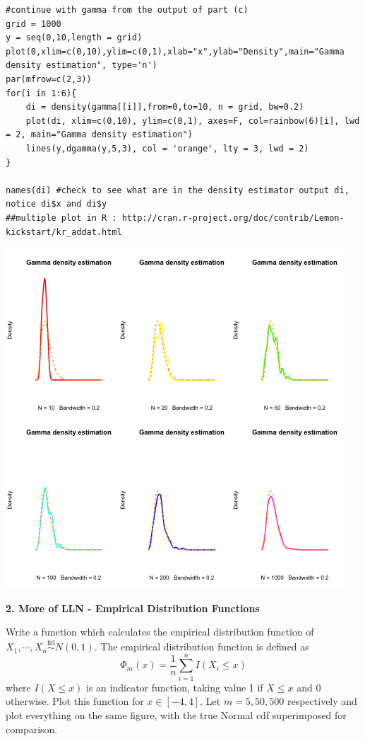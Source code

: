\documentclass[letter,10.5pt]{article}
\numberwithin{equation}{subsection}
\begin{document}
\begin{boxedminipage}{\textwidth}
\scriptsize
\begin{verbatim}
#continue with gamma from the output of part (c)
grid = 1000
y = seq(0,10,length = grid)
plot(0,xlim=c(0,10),ylim=c(0,1),xlab="x",ylab="Density",main="Gamma density estimation", type='n')
par(mfrow=c(2,3))
for(i in 1:6){
    di = density(gamma[[i]],from=0,to=10, n = grid, bw=0.2)
    plot(di, xlim=c(0,10), ylim=c(0,1), axes=F, col=rainbow(6)[i], lwd = 2, main="Gamma density estimation")
    lines(y,dgamma(y,5,3), col = 'orange', lty = 3, lwd = 2)
}

names(di) #check to see what are in the density estimator output di, notice di$x and di$y
##multiple plot in R : http://cran.r-project.org/doc/contrib/Lemon-kickstart/kr_addat.html
\end{verbatim}
\end{boxedminipage}
\begin{center}
\includegraphics[scale=0.4]{1d23.png}
\end{center}

\noindent
\large
\textbf{2. More of LLN - Empirical Distribution Functions}
\normalsize

Write a function which calculates the empirical distribution function of $X_1,\cdots,X_n\stackrel{\text{iid}}{\sim}N(0,1)$. The empirical distribution function is defined as
\begin{equation*}
\Phi_m(x) = \frac{1}{n}\sum_{i=1}^nI(X_i\leq x)
\end{equation*}
where $I(X\leq x)$ is an indicator function, taking value 1 if $X\leq x$ and 0 otherwise. Plot this function for $x\in[-4,4]$. Let $m=5,50,500$ respectively and plot everything on the same figure, with the true Normal cdf superimposed for comparison. 
\end{document}
